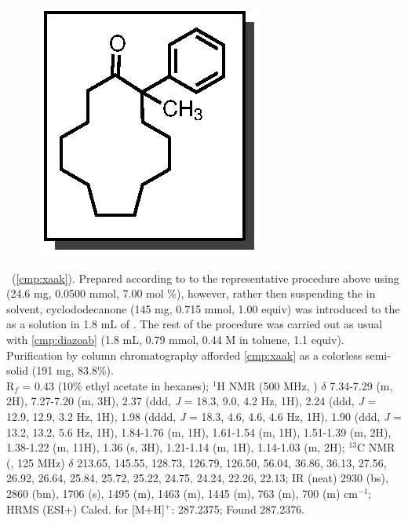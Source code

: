 \vspace{10pt}
\begin{figure}
  \vspace{-23pt}
  \begin{center}
    \includegraphics[scale=0.8]{chp_asymmetric/images/xaak}
  \end{center}
  \vspace{-30pt}
\end{figure}\noindent \textbf{\CMPxaak}\ (\ref{cmp:xaak}). Prepared
according to to the representative procedure above using  (24.6 mg,
0.0500 mmol, 7.00 mol \%), however, rather then suspending the  in
solvent, cyclododecanone (145 mg, 0.715 mmol, 1.00 equiv) was introduced to the
 as a solution in 1.8 mL of . The rest of the procedure
was carried out as usual with \ref{cmp:diazoab} (1.8 mL, 0.79 mmol, 0.44 M in
toluene, 1.1 equiv). Purification by column chromatography afforded
\ref{cmp:xaak} as a colorless semi-solid (191 mg, 83.8\%). \\
R$_f$ = 0.43 (10\% ethyl acetate in hexanes); $^1$H NMR (500 MHz, )
$\delta$ 7.34-7.29 (m, 2H), 7.27-7.20 (m, 3H), 2.37 (ddd, \textit{J} =  18.3, 9.0, 4.2 Hz,
1H), 2.24 (ddd, \textit{J} =  12.9, 12.9, 3.2 Hz, 1H), 1.98 (dddd, \textit{J} = 
18.3, 4.6, 4.6, 4.6 Hz, 1H), 1.90 (ddd, \textit{J} =  13.2, 13.2, 5.6 Hz, 1H),
1.84-1.76 (m, 1H), 1.61-1.54 (m, 1H), 1.51-1.39 (m, 2H), 1.38-1.22 (m, 11H),
1.36 (s, 3H), 1.21-1.14 (m, 1H), 1.14-1.03 (m, 2H); $^{13}$C NMR (,
125 MHz) $\delta$ 213.65, 145.55, 128.73, 126.79, 126.50, 56.04, 36.86, 36.13,
27.56, 26.92, 26.64, 25.84, 25.72, 25.22, 24.75, 24.24, 22.26, 22.13; IR (neat)
2930 (bs), 2860 (bm), 1706 (s), 1495 (m), 1463 (m), 1445 (m), 763 (m), 700 (m)
cm$^{-1}$; HRMS (ESI+)	Calcd.	for	 [M+H]$^+$:	287.2375;	Found
287.2376.

